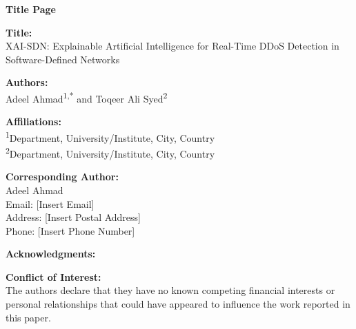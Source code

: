 \documentclass[12pt,a4paper]{article}
\begin{document}
\begin{center}
    \LARGE\textbf{Title Page}
\end{center}

\vspace{1cm}

\noindent\textbf{Title:} \\
XAI-SDN: Explainable Artificial Intelligence for Real-Time DDoS Detection in Software-Defined Networks

\vspace{1cm}

\noindent\textbf{Authors:} \\
Adeel Ahmad\textsuperscript{1,*} and Toqeer Ali Syed\textsuperscript{2}

\vspace{0.5cm}

\noindent\textbf{Affiliations:} \\
\textsuperscript{1}Department, University/Institute, City, Country \\
\textsuperscript{2}Department, University/Institute, City, Country

\vspace{1cm}

\noindent\textbf{Corresponding Author:} \\
Adeel Ahmad \\
Email: [Insert Email] \\
Address: [Insert Postal Address] \\
Phone: [Insert Phone Number]

\vspace{1cm}

\noindent\textbf{Acknowledgments:} \\

\vspace{1cm}

\noindent\textbf{Conflict of Interest:} \\
The authors declare that they have no known competing financial interests or personal relationships that could have appeared to influence the work reported in this paper.
\end{document}
